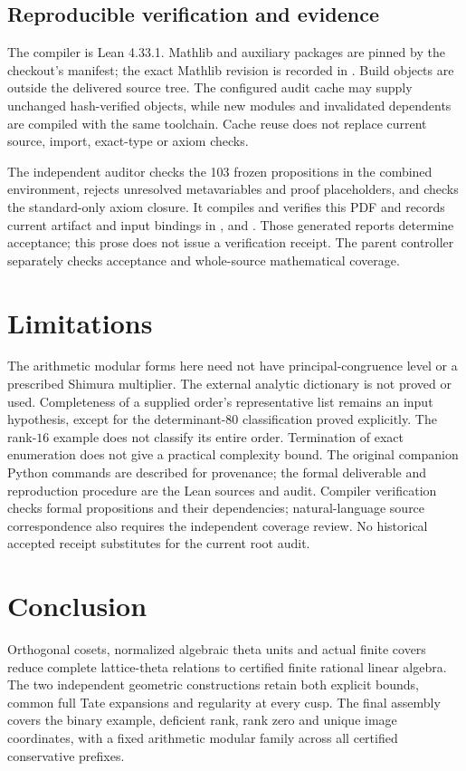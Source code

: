 \documentclass[11pt]{article}
\theoremstyle{remark}\newtheorem{remark}[theorem]{Remark}
\begin{document}
\subsection{Reproducible verification and evidence}
The compiler is Lean 4.33.1. Mathlib and auxiliary packages are pinned by the
checkout's manifest; the exact Mathlib revision is recorded in
. Build objects are outside the delivered source tree.
The configured audit cache may supply unchanged hash-verified objects, while
new modules and invalidated dependents are compiled with the same toolchain.
Cache reuse does not replace current source, import, exact-type or axiom checks.

The independent auditor checks the 103 frozen propositions in the combined
environment, rejects unresolved metavariables and proof placeholders, and
checks the standard-only axiom closure. It compiles and verifies this PDF
and records current artifact and input bindings in
,  and
. Those generated reports determine acceptance;
this prose does not issue a verification receipt. The parent controller
separately checks acceptance and whole-source mathematical coverage.

\section{Limitations}
The arithmetic modular forms here need not have principal-congruence level
or a prescribed Shimura multiplier. The external analytic dictionary is not
proved or used. Completeness of a supplied order's representative list remains
an input hypothesis, except for the determinant-$80$ classification proved
explicitly. The rank-$16$ example does not classify its entire order.
Termination of exact enumeration does not give a practical complexity bound.
The original companion Python commands are described for provenance; the
formal deliverable and reproduction procedure are the Lean sources and audit.
Compiler verification checks formal propositions and their dependencies;
natural-language source correspondence also requires the independent coverage
review. No historical accepted receipt substitutes for the current root audit.

\section{Conclusion}
Orthogonal cosets, normalized algebraic theta units and actual finite covers
reduce complete lattice-theta relations to certified finite rational linear
algebra. The two independent geometric constructions retain both explicit
bounds, common full Tate expansions and regularity at every cusp. The final
assembly covers the binary example, deficient rank, rank zero and unique image
coordinates, with a fixed arithmetic modular family across all certified
conservative prefixes.
\end{document}

